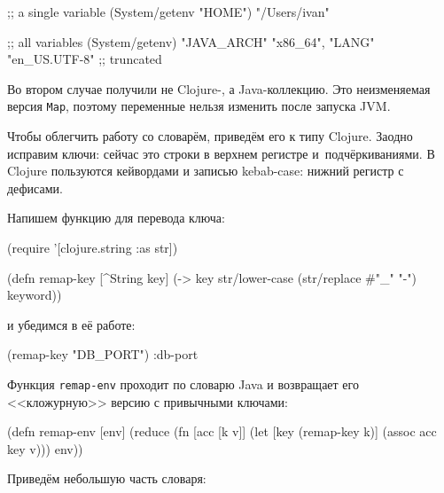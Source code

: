 \else

\begin{english}
  \begin{clojure}
;; a single variable
(System/getenv "HOME")
"/Users/ivan"

;; all variables
(System/getenv)
{"JAVA_ARCH" "x86_64", "LANG" "en_US.UTF-8"} ;; truncated
  \end{clojure}
\end{english}

\fi

Во втором случае получили не Clojure-, а Java-коллекцию. Это неизменяемая версия
\verb|Map|, поэтому переменные нельзя изменить после запуска JVM.

Чтобы облегчить работу со словарём, приведём его к типу Clojure. Заодно исправим
ключи: сейчас это строки в верхнем регистре и~подчёркиваниями. В Clojure
пользуются кейвордами и записью kebab-case: нижний регистр с дефисами.

Напишем функцию для перевода ключа:

\begin{english}
  \begin{clojure}
(require '[clojure.string :as str])

(defn remap-key [^String key]
  (-> key
      str/lower-case
      (str/replace #"_" "-")
      keyword))
  \end{clojure}
\end{english}

\noindent
и убедимся в её работе:

\begin{english}
  \begin{clojure}
(remap-key "DB_PORT")
:db-port
  \end{clojure}
\end{english}


Функция \verb|remap-env| проходит по словарю Java и возвращает его
<<кложурную>> версию с привычными ключами:

\begin{english}
  \begin{clojure}
(defn remap-env [env]
  (reduce
   (fn [acc [k v]]
     (let [key (remap-key k)]
       (assoc acc key v)))
   {}
   env))
  \end{clojure}
\end{english}

Приведём небольшую часть словаря:

